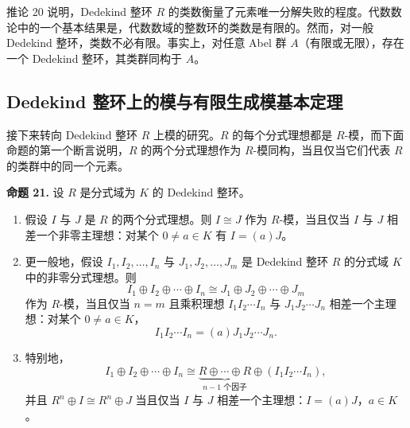 推论 20 说明，Dedekind 整环 $R$ 的类数衡量了元素唯一分解失败的程度。代数数论中的一个基本结果是，代数数域的整数环的类数是有限的。然而，对一般 Dedekind 整环，类数不必有限。事实上，对任意 Abel 群 $A$（有限或无限），存在一个 Dedekind 整环，其类群同构于 $A$。

\subsection*{Dedekind 整环上的模与有限生成模基本定理}

接下来转向 Dedekind 整环 $R$ 上模的研究。$R$ 的每个分式理想都是 $R$-模，而下面命题的第一个断言说明，$R$ 的两个分式理想作为 $R$-模同构，当且仅当它们代表 $R$ 的类群中的同一个元素。

\medskip
\noindent\textbf{命题 21.} 设 $R$ 是分式域为 $K$ 的 Dedekind 整环。
\begin{enumerate}[label=(\arabic*)]
  \item 假设 $I$ 与 $J$ 是 $R$ 的两个分式理想。则 $I\cong J$ 作为 $R$-模，当且仅当 $I$ 与 $J$ 相差一个非零主理想：对某个 $0\neq a\in K$ 有 $I=(a)J$。
  \item 更一般地，假设 $I_1,I_2,
  \ldots,I_n$ 与 $J_1,J_2,
  \ldots,J_m$ 是 Dedekind 整环 $R$ 的分式域 $K$ 中的非零分式理想。则
  \[
    I_1\oplus I_2\oplus\cdots\oplus I_n
    \cong
    J_1\oplus J_2\oplus\cdots\oplus J_m
  \]
  作为 $R$-模，当且仅当 $n=m$ 且乘积理想 $I_1I_2\cdots I_n$ 与 $J_1J_2\cdots J_n$ 相差一个主理想：对某个 $0\neq a\in K$，
  \[
    I_1I_2\cdots I_n=(a)J_1J_2\cdots J_n.
  \]
  \item 特别地，
  \[
    I_1\oplus I_2\oplus\cdots\oplus I_n
    \cong
    \underbrace{R\oplus\cdots\oplus R}_{n-1\text{ 个因子}}
    \oplus (I_1I_2\cdots I_n),
  \]
  并且 $R^n\oplus I\cong R^n\oplus J$ 当且仅当 $I$ 与 $J$ 相差一个主理想：$I=(a)J$，$a\in K$。
\end{enumerate}

